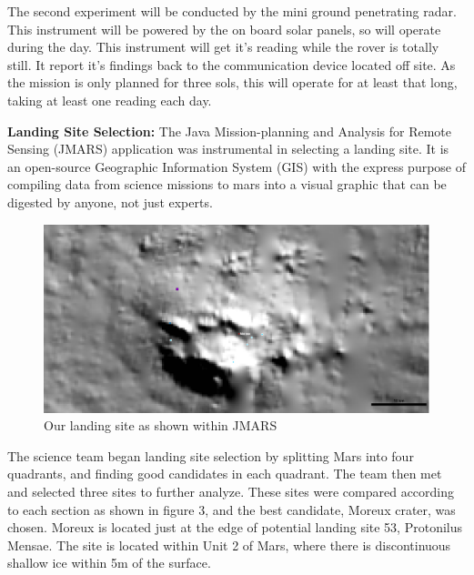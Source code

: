 \documentclass[%
 portrait,
 aapm,
 mph,%
 amsmath,amssymb,
 reprint,%
]{revtex4-2}
\begin{document}
The second experiment will be conducted by the mini ground penetrating radar. This instrument will be powered by the on board solar panels, so will operate during the day. This instrument will get it's reading while the rover is totally still. It report it's findings back to the communication device located off site. As the mission is only planned for three sols, this will operate for at least that long, taking at least one reading each day. 

\textbf{Landing Site Selection:} The Java Mission-planning and Analysis for Remote Sensing (JMARS) application was instrumental in selecting a landing site. It is an open-source Geographic Information System (GIS) with the express purpose of compiling data from science missions to mars into a visual graphic that can be digested by anyone, not just experts. 

\begin{figure}
  \includegraphics[width=\textwidth]{LandingSite/3_1_3_JMARS.png}
  \caption{Our landing site as shown within JMARS \cite{christensen_engle_anwar_dickenshied_noss_gorelick_weiss-malik_2019}}
\end{figure}



The science team began landing site selection by splitting Mars into four quadrants, and finding good candidates in each quadrant. The team then met and selected three sites to further analyze. These sites were compared according to each section as shown in figure 3, and the best candidate, Moreux crater, was chosen. Moreux is located just at the edge of potential landing site 53, Protonilus Mensae. The site is located within Unit 2 of Mars, where there is discontinuous shallow ice within 5m of the surface. 
\end{document}
